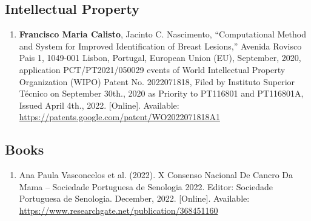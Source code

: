 \subsection{Intellectual Property}
\label{sec:sec00100603}

\begin{enumerate}
\item {\bf Francisco Maria Calisto}, Jacinto C. Nascimento, ``Computational Method and System for Improved Identification of Breast Lesions,'' Avenida Rovisco Pais 1, 1049-001 Lisbon, Portugal, European Union (EU), September, 2020, application PCT/PT2021/050029 events of World Intellectual Property Organization (WIPO) Patent No. 2022071818, Filed by Instituto Superior T\'{e}cnico on September 30th., 2020 as Priority to PT116801 and PT116801A, Issued April 4th., 2022. [Online]. Available: \href{https://patents.google.com/patent/WO2022071818A1}{https://patents.google.com/patent/WO2022071818A1}
\end{enumerate}

\subsection{Books}
\label{sec:sec00100604}

\begin{enumerate}
\item Ana Paula Vasconcelos et al. (2022). X Consenso Nacional De Cancro Da Mama -- Sociedade Portuguesa de Senologia 2022. Editor: Sociedade Portuguesa de Senologia. December, 2022. [Online]. Available: \href{https://www.researchgate.net/publication/368451160}{https://www.researchgate.net/publication/368451160}
\end{enumerate}
